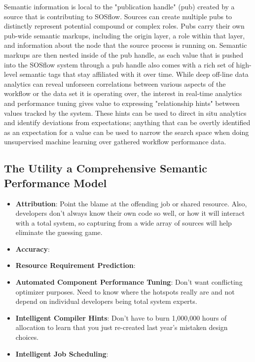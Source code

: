 Semantic information is local to the "publication handle" (pub)
created by a source that is contributing to SOSflow.  Sources can
create multiple pubs to distinctly represent potential compound or
complex roles. Pubs carry their own pub-wide semantic markups,
including the origin layer, a role within that layer, and information
about the node that the source process is running on. Semantic markups
are then nested inside of the pub handle, as each value that is pushed
into the SOSflow system through a pub handle also comes with a rich
set of high-level semantic tags that stay affiliated with it over
time. While deep off-line data analytics can reveal unforseen
correlations between various aspects of the workflow or the data set
it is operating over, the interest in real-time analytics and
performance tuning gives value to expressing "relationship hints"
between values tracked by the system. These hints can be used to
direct in situ analytics and identify deviations from expectations;
anything that can be overtly identified as an expectation for a value
can be used to narrow the search space when doing unsupervised machine
learning over gathered workflow performance data.


\subsection{The Utility a Comprehensive Semantic Performance Model}
\begin{itemize}
\item \textbf{Attribution}: Point the blame at the offending job or shared
  resource. Also, developers don't always know their own code so well,
  or how it will interact with a total system, so capturing from a
  wide array of sources will help eliminate the guessing game.
\item \textbf{Accuracy}:
\item \textbf{Resource Requirement Prediction}:
\item \textbf{Automated Component Performance Tuning}: Don't want conflicting
  optimizer purposes. Need to know where the hotspots really are and
  not depend on individual developers being total system experts.
\item \textbf{Intelligent Compiler Hints}: Don't have to burn 1,000,000 hours
  of allocation to learn that you just re-created last year's mistaken
design choices.
\item \textbf{Intelligent Job Scheduling}:
\end{itemize}

